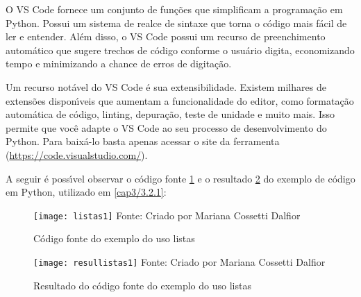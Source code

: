 O VS Code fornece um conjunto de fun\c{c}\~{o}es que simplificam a programa\c{c}\~{a}o em Python. Possui um sistema de realce de sintaxe que torna o c\'{o}digo mais f\'{a}cil de ler e entender. Al\'{e}m disso, o VS Code possui um recurso de preenchimento autom\'{a}tico que sugere trechos de c\'{o}digo conforme o usu\'{a}rio digita, economizando tempo e minimizando a chance de erros de digita\c{c}\~{a}o.

Um recurso not\'{a}vel do VS Code \'{e} sua extensibilidade. Existem milhares de extens\~{o}es dispon\'{\i}veis que aumentam a funcionalidade do editor, como formata\c{c}\~{a}o autom\'{a}tica de c\'{o}digo, linting, depura\c{c}\~{a}o, teste de unidade e muito mais. Isso permite que voc\^{e} adapte o VS Code ao seu processo de desenvolvimento do Python. Para baix\'{a}-lo basta apenas acessar o site da ferramenta (\url{https://code.visualstudio.com/}). \newline

A seguir \'{e} poss\'{\i}vel observar o c\'{o}digo fonte \ref{fontelistas} e o resultado \ref{resullistas} do exemplo de c\'{o}digo em Python, utilizado em \ref{cap3/3.2.1}:

\begin{figure}[H]
	\begin{center}
		\caption{C\'{o}digo fonte do exemplo do uso listas} \label{fontelistas}
		\texttt{[image: listas1]} 
		\newline
		Fonte: Criado por Mariana Cossetti Dalfior
	\end{center}
\end{figure}

\begin{figure}[H]
	\begin{center}
		\caption{Resultado do c\'{o}digo fonte do exemplo do uso listas} \label{resullistas}
		\texttt{[image: resullistas1]} 
		\newline
		Fonte: Criado por Mariana Cossetti Dalfior
	\end{center}
\end{figure}
